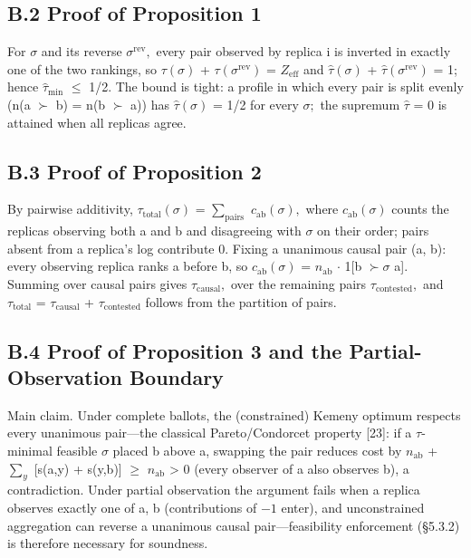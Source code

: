 \documentclass[11pt]{article}
\begin{document}
\subsection{B.2 Proof of Proposition 1}
For $\sigma $ and its reverse $\sigma^{\mathrm{rev}},$ every pair observed by replica i is inverted in exactly one of the two rankings, so $\tau (\sigma )$ + $\tau (\sigma^{\mathrm{rev}})$ = $Z_{\mathrm{eff}}$ and $\hat{\tau}(\sigma )$ + $\hat{\tau}(\sigma^{\mathrm{rev}})$ = 1; hence $\hat{\tau}_{\mathrm{min}}$ $\leq $ 1/2. The bound is tight: a profile in which every pair is split evenly (n(a $\succ $ b) = n(b $\succ $ a)) has $\hat{\tau}(\sigma )$ = 1/2 for every $\sigma ;$ the supremum $\hat{\tau}$ = 0 is attained when all replicas agree.

\subsection{B.3 Proof of Proposition 2}
By pairwise additivity, $\tau _{\mathrm{total}}(\sigma )$ = $\sum _{\mathrm{pairs}}$ $c_{\mathrm{ab}}(\sigma ),$ where $c_{\mathrm{ab}}(\sigma )$ counts the replicas observing both a and b and disagreeing with $\sigma $ on their order; pairs absent from a replica's log contribute 0. Fixing a unanimous causal pair (a, b): every observing replica ranks a before b, so $c_{\mathrm{ab}}(\sigma )$ = $n_{\mathrm{ab}}$ $\cdot $ 1[b $\succ \sigma $ a]. Summing over causal pairs gives $\tau _{\mathrm{causal}},$ over the remaining pairs $\tau _{\mathrm{contested}},$ and $\tau _{\mathrm{total}}$ = $\tau _{\mathrm{causal}}$ + $\tau _{\mathrm{contested}}$ follows from the partition of pairs.

\subsection{B.4 Proof of Proposition 3 and the Partial-Observation Boundary}
Main claim. Under complete ballots, the (constrained) Kemeny optimum respects every unanimous pair—the classical Pareto/Condorcet property [23]: if a $\tau $-minimal feasible $\sigma $ placed b above a, swapping the pair reduces cost by $n_{\mathrm{ab}}$ + $\sum _{y}$ [s(a,y) + s(y,b)] $\geq $ $n_{\mathrm{ab}}$ > 0 (every observer of a also observes b), a contradiction. Under partial observation the argument fails when a replica observes exactly one of a, b (contributions of $-1$ enter), and unconstrained aggregation can reverse a unanimous causal pair—feasibility enforcement (§5.3.2) is therefore necessary for soundness.
\end{document}
